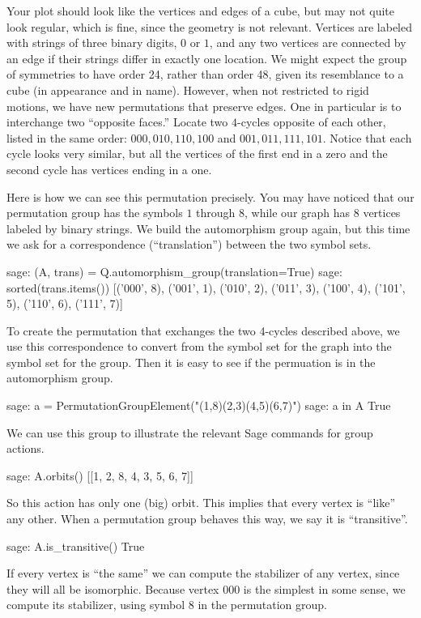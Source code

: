 Your plot should look like the vertices and edges of a cube, but may not quite look regular, which is fine, since the geometry is not relevant.  Vertices are labeled with strings of three binary digits, $0$ or $1$, and any two vertices are connected by an edge if their strings differ in exactly one location.  We might expect the group of symmetries to have order 24, rather than order 48, given its resemblance to a cube (in appearance and in name).  However, when not restricted to rigid motions, we have new permutations that preserve edges.  One in particular is to interchange two ``opposite faces.''  Locate two $4$-cycles opposite of each other, listed in the same order:  $000, 010, 110, 100$ and $001, 011, 111, 101$.  Notice that each cycle looks very similar, but all the vertices of the first end in a zero and the second cycle has vertices ending in a one.\par
%
Here is how we can see this permutation precisely.  You may have noticed that our permutation group has the symbols $1$ through $8$, while our graph has 8 vertices labeled by binary strings.  We build the automorphism group again, but this time we ask for a correspondence (``translation'') between the two symbol sets.
%
\begin{sageexample}
sage: (A, trans) = Q.automorphism_group(translation=True)
sage: sorted(trans.items())
[('000', 8), ('001', 1), ('010', 2), ('011', 3),
 ('100', 4), ('101', 5), ('110', 6), ('111', 7)]
\end{sageexample}
%
To create the permutation that exchanges the two 4-cycles described above, we use this correspondence to convert from the symbol set for the graph into the symbol set for the group.  Then it is easy to see if the permuation is in the automorphism group.
%
\begin{sageexample}
sage: a = PermutationGroupElement("(1,8)(2,3)(4,5)(6,7)")
sage: a in A
True
\end{sageexample}
%
We can use this group to illustrate the relevant Sage commands for group actions.
%
\begin{sageexample}
sage: A.orbits()
[[1, 2, 8, 4, 3, 5, 6, 7]]
\end{sageexample}
%
So this action has only one (big) orbit.  This implies that every vertex is ``like'' any other.  When a permutation group behaves this way, we say it is ``transitive''.
%
\begin{sageexample}
sage: A.is_transitive()
True
\end{sageexample}
%
If every vertex is ``the same'' we can compute the stabilizer of any vertex, since they will all be isomorphic.  Because vertex $000$ is the simplest in some sense, we compute its stabilizer, using symbol $8$ in the permutation group.
